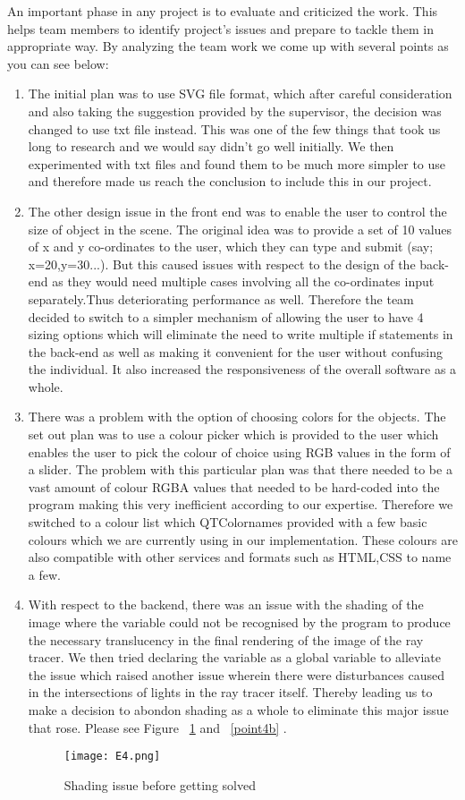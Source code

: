 \documentclass{article}
\begin{document}
An important phase in any project is to evaluate and criticized the work. This helps team members to identify project's issues and prepare to tackle them in appropriate way. By analyzing the team work we come up with several points as you can see below:
\begin{enumerate}
    
    \item 	The initial plan was to use SVG file format, which after careful consideration and also taking the suggestion provided by the supervisor, the decision was changed to use txt file instead. This was one of the few things that took us long to research and we would say didn’t go well initially. We then experimented with txt files and found them to be much more simpler to use and therefore made us reach the conclusion to include this in our project. 
\item 	 The other design issue in the front end was to enable the user to control the size of  object in the scene. The original idea was to provide a set of 10 values of x and y co-ordinates to the user, which they can type and submit (say; x=20,y=30...). But this caused issues with respect to the design of the back-end as they would need multiple cases involving all the co-ordinates input separately.Thus deteriorating performance as well. Therefore the team decided to switch to a simpler mechanism of allowing the user to have 4 sizing options which will eliminate the need to write multiple if statements in the back-end as well as making it convenient for the user without confusing the individual. It also increased the responsiveness of the overall software as a whole.  
\item 	There was a problem with the option of choosing colors for the objects. The set out plan was to use a colour picker which is provided to the user which enables the user to pick the colour of choice using RGB values in the form of a slider.  The problem with this particular plan was that there needed to be a vast amount  of colour RGBA values that needed to be hard-coded into the program making this very inefficient according to our expertise. Therefore we switched to a colour list which QTColornames provided with a few basic colours which we are currently using in our implementation. These colours are also compatible with other services and formats such as HTML,CSS to name a few. 
\item 	With respect to the backend, there was an issue with the shading of the image where the variable could not be recognised by the program to produce the necessary translucency in the final rendering of the image of the ray tracer. We then tried declaring the variable as a global variable to alleviate the issue which raised another issue wherein there were disturbances caused in the intersections of lights in the  ray tracer itself. Thereby leading us to make a decision to abondon shading as a whole to eliminate this major issue that rose. Please see Figure ~\ref{point4a} and ~\ref{point4b} . 
\begin{figure}[h]
\centering
\texttt{[image: E4.png]}
\caption{Shading issue before getting solved \label{point4a}}
\end{figure}


\end{enumerate}
\end{document}
